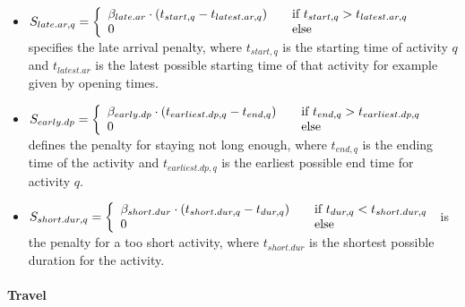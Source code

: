 \begin{itemize}
\item $S_{late.ar,q}= \left\{
  \begin{array}{l l}
    \beta_{late.ar} \cdot (t_{start,q} - t_{latest.ar,q}) & \quad \text{if $t_{start,q} > t_{latest.ar,q}$}\\
    0 & \quad \text{else}
  \end{array} \right.$
%  
  specifies the late arrival penalty, where $t_{start,q}$ is the starting time of activity $q$ and $t_{latest.ar}$ is the latest possible starting time of that activity for example given by opening times.
%
\item $S_{early.dp} = \left\{
  \begin{array}{l l}
    \beta_{early.dp} \cdot (t_{earliest.dp, q} - t_{end,q}) & \quad \text{if $t_{end,q} > t_{earliest.dp,q}$}\\
    0 & \quad \text{else}
  \end{array} \right.$
%
defines the penalty for staying not long enough, where $t_{end,q}$ is the ending time of the activity and $t_{earliest.dp,q}$ is the earliest possible end time for activity $q$.
%
\item $ S_{short.dur, q} = \left\{
  \begin{array}{l l}
    \beta_{short.dur} \cdot (t_{short.dur, q} - t_{dur,q}) & \quad \text{if $t_{dur,q} < t_{short.dur,q}$}\\
    0 & \quad \text{else}
  \end{array} \right.$
%  
  is the penalty for a too short activity, where $t_{short.dur}$ is the shortest possible duration for the activity.
\end{itemize}

\paragraph{Travel} 


